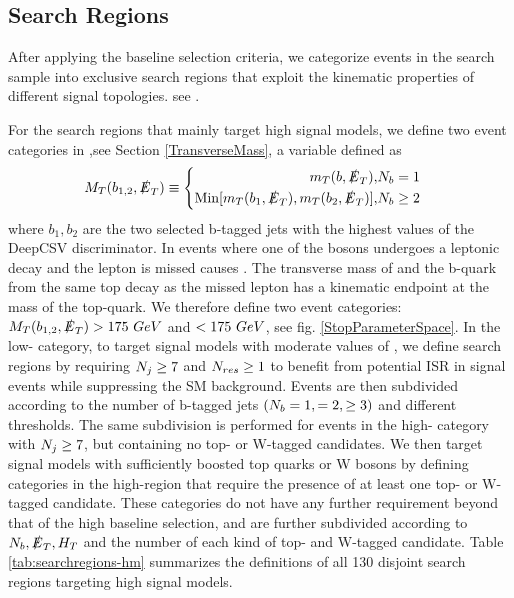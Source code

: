\subsection{Search Regions}\label{SearchRegions}

After applying the baseline selection criteria, we categorize events in the search sample into exclusive search regions that exploit the kinematic properties of different signal topologies. see \cite{noauthor_search_nodate, alwall_simplified_2009-1, alwall_model-independent_2009-1}. 

For the search regions that mainly target high \dm{} signal models, we define two event categories in \mtb,see Section \ref{TransverseMass}, a variable defined as
\begin{equation}
M_{T}(b_{1,2},\slashed{E}_{T})\equiv
\begin{cases}
\begin{split}
m_T(b,\slashed{E}_{T}), &N_{b}=1 \\
\text{Min}[m_T(b_1, \slashed{E}_{T}),m_T(b_2,\slashed{E}_{T})], &N_{b}\geq2 \\
\end{split}
\end{cases}
\end{equation}
where $b_1, b_2$ are the two selected b-tagged jets with the highest values of the DeepCSV discriminator. In \ttbar{} events where one of the \W{} bosons undergoes a leptonic decay and the lepton is missed causes \met{}. The transverse mass of \met{} and the b-quark from the same top decay as the missed lepton has a kinematic endpoint at the mass of the top-quark. We therefore define two event categories: $M_{T}(b_{1,2},\slashed{E}_{T})>175~GeV$ and $< 175~GeV$, see fig. \ref{StopParameterSpace}. In the low-\mtb{} category, to target signal models with moderate values of \dm, we define search regions by requiring $N_{j}\geq7$ and $N_{res}\geq1$ to benefit from potential ISR in signal events while suppressing the SM background. Events are then subdivided according to the number of b-tagged jets $(N_{b}=1,=2,\geq3)$ and different \met{} thresholds. The same subdivision is performed for events in the high-\mtb{} category with $N_{j}\geq7$, but containing no top- or W-tagged candidates. We then target signal models with sufficiently boosted top quarks or W bosons by defining categories in the high-\mtb region that require the presence of at least one top- or W-tagged candidate. These categories do not have any further \nj{} requirement beyond that of the high \dm{} baseline selection, and are further subdivided according to $N_{b}, \slashed{E}_{T}, H_{T}$ and the number of each kind of top- and W-tagged candidate. Table \ref{tab:searchregions-hm} summarizes the definitions of all 130 disjoint search regions targeting high \dm{} signal models.


